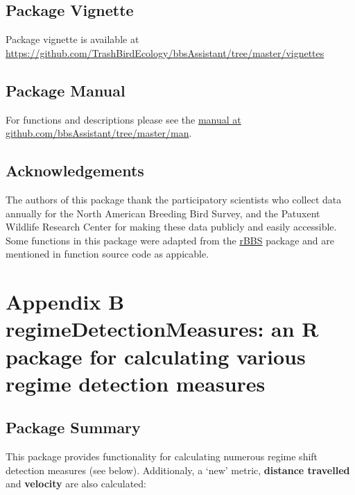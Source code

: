 \documentclass[12pt,twoside,openany]{reedthesis}
\begin{document}
\hypertarget{package-vignette}{%
\section{Package Vignette}\label{package-vignette}}

Package vignette is available at \url{https://github.com/TrashBirdEcology/bbsAssistant/tree/master/vignettes}

\hypertarget{package-manual}{%
\section{Package Manual}\label{package-manual}}

For functions and descriptions please see the \href{https://github.com/TrashBirdEcology/bbsAssistant/tree/master/man}{manual at github.com/bbsAssistant/tree/master/man}.

\hypertarget{acknowledgements-1}{%
\section{Acknowledgements}\label{acknowledgements-1}}

The authors of this package thank the participatory scientists who collect data annually for the North American Breeding Bird Survey, and the Patuxent Wildlife Research Center for making these data publicly and easily accessible. Some functions in this package were adapted from the \href{github.com/oharar/rbbs}{rBBS} package and are mentioned in function source code as appicable.

\appendix

\hypertarget{regimeDetectionMeasures}{%
\chapter*{Appendix B regimeDetectionMeasures: an R package for calculating various regime detection measures}\label{regimeDetectionMeasures}}

\hypertarget{package-summary-1}{%
\section{Package Summary}\label{package-summary-1}}

This package provides functionality for calculating numerous regime shift detection measures (see below). Additionaly, a `new' metric, \textbf{distance travelled} and \textbf{velocity} are also calculated:
\end{document}
